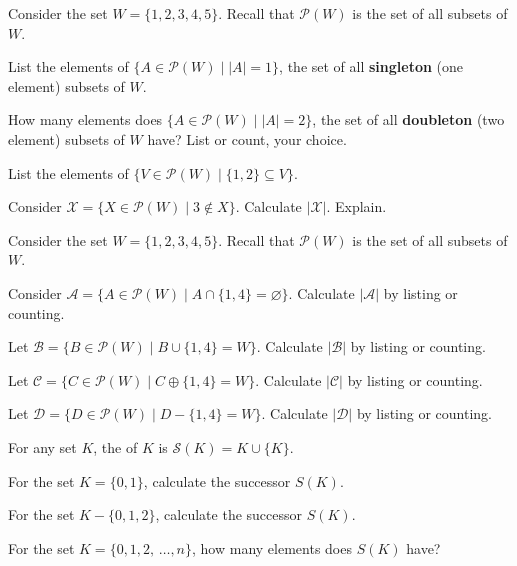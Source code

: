 \begin{exer}[\exerU] %
\label{exer_set_of_select_subsets}
    Consider the set $W = \{1,2,3,4,5\}$. Recall that $\mathscr{P}(W)$ is the set of all subsets of $W$. 
        \begin{exerpart}
            \item List the elements of $\{ A \in \mathscr{P}(W) \mid |A| = 1\}$, the set of all \textbf{singleton} (one element) subsets of $W$.  
            \item How many elements does $\{ A \in \mathscr{P}(W) \mid |A| = 2\}$, the set of all \textbf{doubleton} (two element) subsets of $W$ have?  List or count, your choice.
            \item List the elements of  $\{ V \in \mathscr{P}(W) \mid \{1,2\} \subseteq V\}$.  
            \item Consider $\mathscr{X} = \{ X \in \mathscr{P}(W) \mid  3 \notin X\}$.  Calculate $|\mathscr{X}|$.  Explain.
        \end{exerpart}
\end{exer}

\begin{exer}[\exerU] %
\label{exer_set_of_subsets_setops}
    Consider the set $W = \{1,2,3,4,5\}$. Recall that $\mathscr{P}(W)$ is the set of all subsets of $W$. 
        \begin{exerpart}
            \item Consider $\mathscr{A} = \{ A \in \mathscr{P}(W) \mid A \cap \{1,4\} = \varnothing\}$. Calculate $|\mathscr{A}|$ by listing or counting.
            \item Let $\mathscr{B}= \{ B \in \mathscr{P}(W) \mid B \cup \{1,4\}=W\}$. Calculate $|\mathscr{B}|$ by listing or counting.
            \item Let $\mathscr{C} = \{ C \in \mathscr{P}(W) \mid C \oplus \{1,4\} = W\}$. Calculate $|\mathscr{C}|$ by listing or counting.
            \item Let $\mathscr{D} = \{ D \in \mathscr{P}(W) \mid D - \{1,4\} = W\}$. Calculate $|\mathscr{D}|$ by listing or counting.
        \end{exerpart}
\end{exer}

\begin{exer}[\exerU] %
\label{exer_successor_set}
    For any set $K$, the  of $K$ is $\mathscr{S}(K)= K \cup \{K\}$.
        \begin{exerpart}
            \item For the set $K=\{0,1\}$, calculate the successor $S(K)$. 
            \item For the set $K - \{0,1,2\}$, calculate the successor $S(K)$.
            \item For the set $K = \{0,1,2,\, \ldots, n\}$, how many elements does $S(K)$ have?
        \end{exerpart}      
\end{exer}

